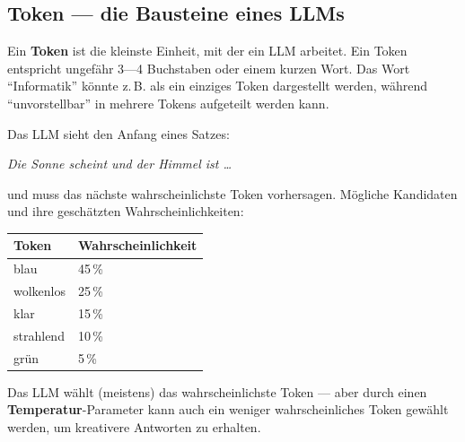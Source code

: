 \subsection{Token --- die Bausteine eines LLMs}

\begin{mydefinition}
Ein \textbf{Token} ist die kleinste Einheit, mit der ein LLM arbeitet. Ein Token
entspricht ungefähr 3---4 Buchstaben oder einem kurzen Wort. Das Wort
\enquote{Informatik} könnte z.\,B. als ein einziges Token dargestellt werden,
während \enquote{unvorstellbar} in mehrere Tokens aufgeteilt werden kann.
\end{mydefinition}

\begin{myexample}
Das LLM sieht den Anfang eines Satzes:
\begin{center}
    \textit{Die Sonne scheint und der Himmel ist \ldots}
\end{center}
und muss das nächste wahrscheinlichste Token vorhersagen.
Mögliche Kandidaten und ihre geschätzten Wahrscheinlichkeiten:

\begin{center}
\begin{tabular}{ll}
    \toprule
    \textbf{Token} & \textbf{Wahrscheinlichkeit} \\
    \midrule
    blau           & 45\,\%                       \\
    wolkenlos      & 25\,\%                       \\
    klar           & 15\,\%                       \\
    strahlend      & 10\,\%                       \\
    grün           & 5\,\%                        \\
    \bottomrule
\end{tabular}
\end{center}

Das LLM wählt (meistens) das wahrscheinlichste Token --- aber durch einen
\textbf{Temperatur}-Parameter kann auch ein weniger wahrscheinliches Token
gewählt werden, um kreativere Antworten zu erhalten.
\end{myexample}

